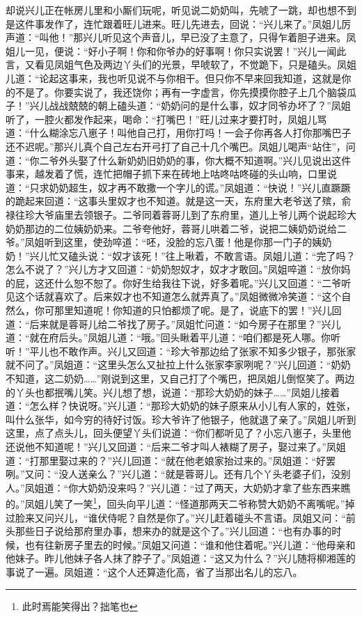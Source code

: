 \documentclass[12pt,oneside]{book}
\begin{document}
却说兴儿正在帐房儿里和小厮们玩呢，听见说二奶奶叫，先唬了一跳，却也想不到是这件事发作了，连忙跟着旺儿进来。旺儿先进去，回说：“兴儿来了。”凤姐儿厉声道：“叫他！”那兴儿听见这个声音儿，早已没了主意了，只得乍着胆子进来。凤姐儿一见，便说：“好小子啊！你和你爷办的好事啊！你只实说罢！”兴儿一闻此言，又看见凤姐气色及两边丫头们的光景，早唬软了，不觉跪下，只是磕头。凤姐儿道：“论起这事来，我也听见说不与你相干。但只你不早来回我知道，这就是你的不是了。你要实说了，我还饶你；再有一字虚言，你先摸摸你腔子上几个脑袋瓜子！”兴儿战战兢兢的朝上磕头道：“奶奶问的是什么事，奴才同爷办坏了？”凤姐听了，一腔火都发作起来，喝命：“打嘴巴！”旺儿过来才要打时，凤姐儿骂道：“什么糊涂忘八崽子！叫他自己打，用你打吗！一会子你再各人打你那嘴巴子还不迟呢。”那兴儿真个自己左右开弓打了自己十几个嘴巴。凤姐儿喝声“站住”，问道：“你二爷外头娶了什么新奶奶旧奶奶的事，你大概不知道啊。”兴儿见说出这件事来，越发着了慌，连忙把帽子抓下来在砖地上咕咚咕咚碰的头山响，口里说道：“只求奶奶超生，奴才再不敢撒一个字儿的谎。”凤姐道：“快说！”兴儿直蹶蹶的跪起来回道：“这事头里奴才也不知道。就是这一天，东府里大老爷送了殡，俞禄往珍大爷庙里去领银子。二爷同着蓉哥儿到了东府里，道儿上爷儿两个说起珍大奶奶那边的二位姨奶奶来。二爷夸他好，蓉哥儿哄着二爷，说把二姨奶奶说给二爷。”凤姐听到这里，使劲啐道：“呸，没脸的忘八蛋！他是你那一门子的姨奶奶！”兴儿忙又磕头说：“奴才该死！”往上啾着，不敢言语。凤姐儿道：“完了吗？怎么不说了？”兴儿方才又回道：“奶奶恕奴才，奴才才敢回。”凤姐啐道：“放你妈的屁，这还什么恕不恕了。你好生给我往下说，好多着呢。”兴儿又回道：“二爷听见这个话就喜欢了。后来奴才也不知道怎么就弄真了。”凤姐微微冷笑道：“这个自然么，你可那里知道呢！你知道的只怕都烦了呢。是了，说底下的罢！”兴儿回道：“后来就是蓉哥儿给二爷找了房子。”凤姐忙问道：“如今房子在那里？”兴儿道：“就在府后头。”凤姐儿道：“哦。”回头瞅着平儿道：“咱们都是死人哪。你听听！”平儿也不敢作声。兴儿又回道：“珍大爷那边给了张家不知多少银子，那张家就不问了。”凤姐道：“这里头怎么又扯拉上什么张家李家咧呢？”兴儿回道：“奶奶不知道，这二奶奶……”刚说到这里，又自己打了个嘴巴，把凤姐儿倒怄笑了。两边的丫头也都抿嘴儿笑。兴儿想了想，说道：“那珍大奶奶的妹子……”凤姐儿接着道：“怎么样？快说呀。”兴儿道：“那珍大奶奶的妹子原来从小儿有人家的，姓张，叫什么张华，如今穷的待好讨饭。珍大爷许了他银子，他就退了亲了。”凤姐儿听到这里，点了点头儿，回头便望丫头们说道：“你们都听见了？小忘八崽子，头里他还说他不知道呢！”兴儿又回道：“后来二爷才叫人裱糊了房子，娶过来了。”凤姐道：“打那里娶过来的？”兴儿回道：“就在他老娘家抬过来的。”凤姐道：“好罢咧。”又问：“没人送亲么？”兴儿道：“就是蓉哥儿。还有几个丫头老婆子们，没别人。”凤姐道：“你大奶奶没来吗？”兴儿道：“过了两天，大奶奶才拿了些东西来瞧的。”凤姐儿笑了一笑\footnote{此时焉能笑得出？拙笔也}，回头向平儿道：“怪道那两天二爷称赞大奶奶不离嘴呢。”掉过脸来又问兴儿，“谁伏侍呢？自然是你了。”兴儿赶着碰头不言语。凤姐又问：“前头那些日子说给那府里办事，想来办的就是这个了。”兴儿回道：“也有办事的时候，也有往新房子里去的时候。”凤姐又问道：“谁和他住着呢。”兴儿道：“他母亲和他妹子。昨儿他妹子各人抹了脖子了。”凤姐道：“这又为什么？”兴儿随将柳湘莲的事说了一遍。凤姐道：“这个人还算造化高，省了当那出名儿的忘八。
\end{document}
